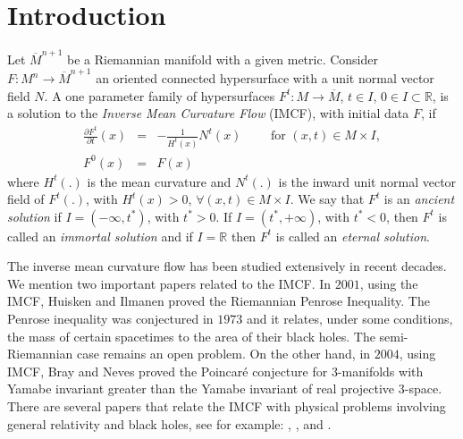 \documentclass[11pt,a4paper,reqno]{amsproc}
\numberwithin{equation}{section}
\newcommand{\R}{\mathbb{R}}
\begin{document}

\section{Introduction}\label{Introduction}
Let $\overline{M}^{n+1}$ be a Riemannian manifold with a given metric. Consider $F:M^{n} \longrightarrow \overline{M}^{n+1}$ an oriented connected  hypersurface with a unit normal vector field $N$. A one parameter family of hypersurfaces ${F}^t:M \longrightarrow \overline{M}$,  $t\in I$, $0 \in I \subset \R$, is a solution to the {\it {Inverse Mean Curvature Flow}} (IMCF), with initial data $F$, if
\begin{eqnarray}\label{eqIMCF}
\frac{\partial {F}^t}{\partial t}(x)&=&-\frac{1}{{H}^t(x)}{N}^t(x)\qquad \mbox{ for } (x,t)\in M \times I,  \\
{F}^0(x)&=&F(x)
\nonumber
\end{eqnarray}
where ${H}^{t}(.)$ is the mean curvature and ${N}^{t}(.)$ 
is the inward unit normal vector field of ${F}^{t}(.)$, with ${H}^{t}(x)>0$, $\forall (x,t) \in M\times I$. We say that ${F}^t$ is an {\it {ancient solution}} if $I=(-\infty,t^{*})$, with $t^{*}>0$. If $I=(t^{*},+\infty)$, with $t^{*}<0$, then ${F}^t$ is called an {\it {immortal solution}} and if $I=\R$ then  ${F}^t$ is called an {\it {eternal solution}}.

The inverse mean curvature flow has been studied extensively in recent decades. We mention two important papers related to the IMCF. In $2001$, using the IMCF, Huisken and Ilmanen \cite{HuiskenIlmanen} proved the Riemannian Penrose Inequality. The Penrose inequality was conjectured in $1973$ and it relates, under some conditions, the mass of certain spacetimes to the area of their black holes. The semi-Riemannian case remains an open problem.  On the other hand, in $2004$, using IMCF, Bray and Neves \cite{BrayNeves} proved the Poincaré conjecture for $3$-manifolds with Yamabe invariant greater than the Yamabe invariant of real projective $3$-space. There are several papers that relate the IMCF with physical problems involving general relativity and black holes, see for example: \cite{Bray}, \cite{LeeandNeves}, \cite{Ger} and \cite{Ger2}. 
\end{document}
